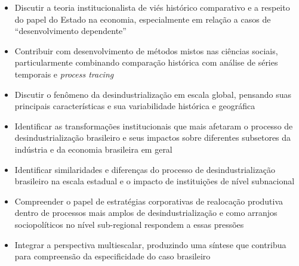 \begin{itemize}
\item
  Discutir a teoria institucionalista de viés histórico comparativo e a
  respeito do papel do Estado na economia, especialmente em relação a
  casos de ``desenvolvimento dependente''
\item
  Contribuir com desenvolvimento de métodos mistos nas ciências sociais,
  particularmente combinando comparação histórica com análise de séries
  temporais e \emph{process tracing}
\item
  Discutir o fenômeno da desindustrialização em escala global, pensando
  suas principais características e sua variabilidade histórica e
  geográfica
\item
  Identificar as transformações institucionais que mais afetaram o
  processo de desindustrialização brasileiro e seus impactos sobre
  diferentes subsetores da indústria e da economia brasileira em geral
\item
  Identificar similaridades e diferenças do processo de
  desindustrialização brasileiro na escala estadual e o impacto de
  instituições de nível subnacional
\item
  Compreender o papel de estratégias corporativas de realocação
  produtiva dentro de processos mais amplos de desindustrialização e
  como arranjos sociopolíticos no nível sub-regional respondem a essas
  pressões
\item
  Integrar a perspectiva multiescalar, produzindo uma síntese que
  contribua para compreensão da especificidade do caso brasileiro
\end{itemize}
